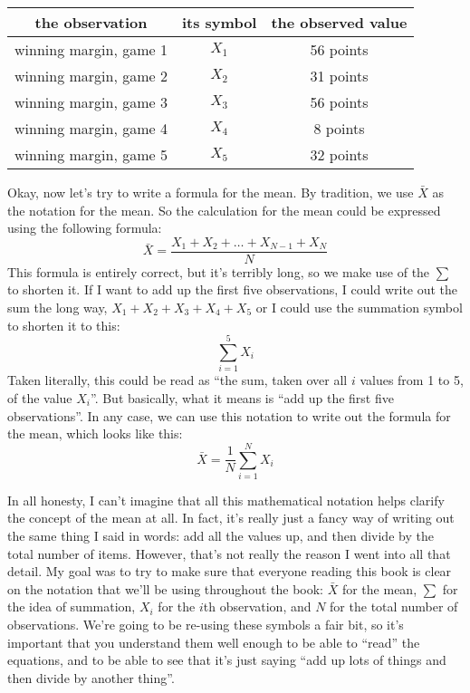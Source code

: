 \begin{center}
\begin{tabular}{ccc}
the observation & its symbol & the observed value \\ \hline
winning margin, game 1 & $X_1$ & 56 points \\
winning margin, game 2 & $X_2$ & 31 points \\
winning margin, game 3 & $X_3$ & 56 points \\
winning margin, game 4 & $X_4$ & 8 points \\
winning margin, game 5 & $X_5$ & 32 points \\
\end{tabular}
\end{center}

\noindent
Okay, now let's try to write a formula for the mean. By tradition, we use $\bar{X}$ as the notation for the mean. So the calculation for the mean could be expressed using the following formula:
$$
\bar{X} = \frac{X_1 + X_2 + \ldots + X_{N-1} + X_N}{N}
$$
This formula is entirely correct, but it's terribly long, so we make use of the  $\scriptstyle\sum$ to shorten it. If I want to add up the first five observations, I could write out the sum the long way, $X_1 + X_2 + X_3 + X_4 +X_5$ or I could use the summation symbol to shorten it to this:
$$
\sum_{i=1}^5 X_i
$$
Taken literally, this could be read as ``the sum, taken over all $i$ values from 1 to 5, of the value $X_i$''. But basically, what it means is ``add up the first five observations''. In any case, we can use this notation to write out the formula for the mean, which looks like this:
$$
\bar{X} = \frac{1}{N} \sum_{i=1}^N X_i 
$$

In all honesty, I can't imagine that all this mathematical notation helps clarify the concept of the mean at all. In fact, it's really just a fancy way of writing out the same thing I said in words: add all the values up, and then divide by the total number of items. However, that's not really the reason I went into all that detail. My goal was to try to make sure that everyone reading this book is clear on the notation that we'll be using throughout the book: $\bar{X}$ for the mean, $\scriptstyle\sum$ for the idea of summation, $X_i$ for the $i$th observation, and $N$ for the total number of observations. We're going to be re-using these symbols a fair bit, so it's important that you understand them well enough to be able to ``read'' the equations, and to be able to see that it's just saying ``add up lots of things and then divide by another thing''.


